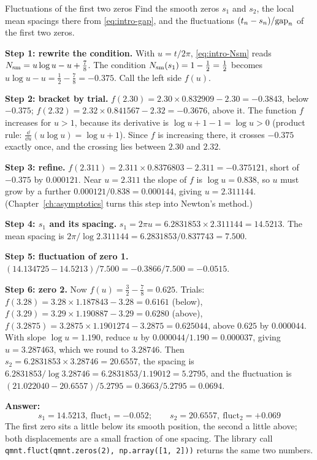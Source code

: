 \begin{sample}{Fluctuations of the first two zeros}
Find the smooth zeros $s_1$ and $s_2$, the local mean spacings there from \cref{eq:intro-gap}, and the fluctuations $(t_n - s_n)/\mathrm{gap}_n$ of the first two zeros.

\textbf{Step 1: rewrite the condition.} With $u = t/2\pi$, \cref{eq:intro-Nsm} reads $N_{\mathrm{sm}} = u\log u - u + \tfrac78$. The condition $N_{\mathrm{sm}}(s_1) = 1 - \tfrac12 = \tfrac12$ becomes $u\log u - u = \tfrac12 - \tfrac78 = -0.375$. Call the left side $f(u)$.

\textbf{Step 2: bracket by trial.} $f(2.30) = 2.30\times 0.832909 - 2.30 = -0.3843$, below $-0.375$; $f(2.32) = 2.32\times 0.841567 - 2.32 = -0.3676$, above it. The function $f$ increases for $u > 1$, because its derivative is $\log u + 1 - 1 = \log u > 0$ (product rule: $\frac{\dd}{\dd u}(u\log u) = \log u + 1$). Since $f$ is increasing there, it crosses $-0.375$ exactly once, and the crossing lies between $2.30$ and $2.32$.

\textbf{Step 3: refine.} $f(2.311) = 2.311\times 0.8376803 - 2.311 = -0.375121$, short of $-0.375$ by $0.000121$. Near $u = 2.311$ the slope of $f$ is $\log u = 0.838$, so $u$ must grow by a further $0.000121/0.838 = 0.000144$, giving $u = 2.311144$. (Chapter~\ref{ch:asymptotics} turns this step into Newton's method.)

\textbf{Step 4: $s_1$ and its spacing.} $s_1 = 2\pi u = 6.2831853\times 2.311144 = 14.5213$. The mean spacing is $2\pi/\log 2.311144 = 6.2831853/0.837743 = 7.500$.

\textbf{Step 5: fluctuation of zero 1.} $(14.134725 - 14.5213)/7.500 = -0.3866/7.500 = -0.0515$.

\textbf{Step 6: zero 2.} Now $f(u) = \tfrac32 - \tfrac78 = 0.625$. Trials: $f(3.28) = 3.28\times1.187843 - 3.28 = 0.6161$ (below), $f(3.29) = 3.29\times 1.190887 - 3.29 = 0.6280$ (above), $f(3.2875) = 3.2875\times 1.1901274 - 3.2875 = 0.625044$, above $0.625$ by $0.000044$. With slope $\log u = 1.190$, reduce $u$ by $0.000044/1.190 = 0.000037$, giving $u = 3.287463$, which we round to $3.28746$. Then $s_2 = 6.2831853\times 3.28746 = 20.6557$, the spacing is $6.2831853/\log 3.28746 = 6.2831853/1.19012 = 5.2795$, and the fluctuation is $(21.022040 - 20.6557)/5.2795 = 0.3663/5.2795 = 0.0694$.

\textbf{Answer:}
\[
\boxed{s_1 = 14.5213,\ \text{fluct}_1 = -0.052;\qquad s_2 = 20.6557,\ \text{fluct}_2 = +0.069}
\]
The first zero sits a little below its smooth position, the second a little above; both displacements are a small fraction of one spacing. The library call \texttt{qmnt.fluct(qmnt.zeros(2), np.array([1, 2]))} returns the same two numbers.
\end{sample}

